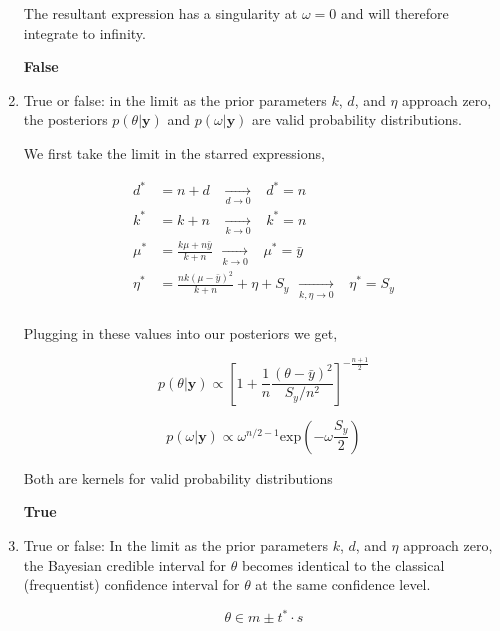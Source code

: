 \documentclass[10pt]{article}
\newcommand{\by}{\mathbf{y}}
\begin{document}
\begin{enumerate}[label=(\Alph*)]
        The resultant expression has a singularity at $\omega=0$ and will therefore integrate to infinity. 

        \textbf{False}

      \item True or false: in the limit as the prior parameters $k$, $d$, and $\eta$ approach zero, the posteriors $p(\theta | \by)$ and $p(\omega | \by)$ are valid probability distributions.

        We first take the limit in the starred expressions,

        \begin{align*}
          d^* &= n+d \hspace{10pt}\xrightarrow[d\to0]{} \hspace{10pt} d^* = n \\
          k^* &= k+n \hspace{10pt}\xrightarrow[k\to0]{} \hspace{10pt} k^* = n \\
          \mu^* &= \frac{k\mu + n \bar{y}}{k+n} \hspace{5pt}\xrightarrow[k\to0]{} \hspace{10pt} \mu^* = \bar{y} \\
          \eta^* &= \frac{nk (\mu- \bar{y})^2}{k+n} + \eta + S_y \hspace{5pt}\xrightarrow[k,\eta\to0]{} \hspace{10pt} \eta^* = S_y \\
        \end{align*}

        Plugging in these values into our posteriors we get,

        $$p(\theta|\by) \propto \left[1 + \frac{1}{n} \frac{(\theta - \bar{y})^2}{S_y/n^2} \right]^{-\frac{n+1}{2}}$$

        $$p(\omega|\by) \propto \omega^{n/2 -1} \text{exp}\left( -\omega \frac{S_y}{2}\right)$$

        Both are kernels for valid probability distributions

        \textbf{True}

      \item True or false: In the limit as the prior parameters $k$, $d$, and $\eta$ approach zero, the Bayesian credible interval for $\theta$ becomes identical to the classical (frequentist) confidence interval for $\theta$ at the same confidence level.



        $$\theta \in m \pm t^* \cdot s $$


\end{enumerate}
\end{document}
